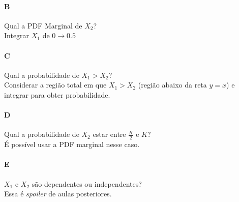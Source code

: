 \documentclass{article}
\renewcommand\it[1]{\textit{#1}}
\begin{document}
\paragraph{B} Qual a PDF Marginal de $X_2$?
\\
Integrar $X_1$ de $0 \to 0.5$

\paragraph{C} Qual a probabilidade de $X_1 > X_2$?
\\
Considerar a região total em que $X_1 > X_2$ (região abaixo da reta $y=x$) e integrar para obter
probabilidade.

\paragraph{D} Qual a probabilidade de $X_2$ estar entre $\frac{K}{2}$ e $K$?
\\
É possível usar a PDF marginal nesse caso.

\paragraph{E} $X_1 \text{ e } X_2$ são dependentes ou independentes?
\\
Essa é \it{spoiler} de aulas posteriores.
\end{document}
